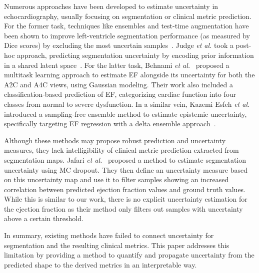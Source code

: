 Numerous approaches have been developed to estimate uncertainty in echocardiography, usually focusing on segmentation or clinical metric prediction. For the former task, techniques like ensembles and test-time augmentation have been shown to improve left-ventricle segmentation performance (as measured by Dice scores) by excluding the most uncertain samples~\cite{unc_2d_echo}. Judge \textit{et al.} took a post-hoc approach, predicting segmentation uncertainty by encoding prior information in a shared latent space~\cite{judge_crisp}. For the latter task, Behnami \textit{et al.}~\cite{dual_view_unc} proposed a multitask learning approach to estimate EF alongside its uncertainty for both the A2C and A4C views, using Gaussian modeling. Their work also included a classification-based prediction of EF, categorizing cardiac function into four classes from normal to severe dysfunction. In a similar vein, Kazemi Esfeh \textit{et al.} introduced a sampling-free ensemble method to estimate epistemic uncertainty, specifically targeting EF regression with a delta ensemble approach~\cite{DEUE}.

Although these methods may propose robust prediction and uncertainty measures, they lack intelligibility of clinical metric prediction extracted from segmentation maps. Jafari \textit{et al.}~\cite{Jafari_bayesian_ef_uncertainty} proposed a method to estimate segmentation uncertainty using MC dropout. They then define an uncertainty measure based on this uncertainty map and use it to filter samples showing an increased correlation between predicted ejection fraction values and ground truth values. While this is similar to our work, there is no explicit uncertainty estimation for the ejection fraction as their method only filters out samples with uncertainty above a certain threshold. 

In summary, existing methods have failed to connect uncertainty for segmentation and the resulting clinical metrics. This paper addresses this limitation by providing a method to quantify and propagate uncertainty from the predicted shape to the derived metrics in an interpretable way.



